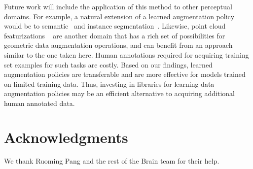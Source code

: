 \documentclass[10pt,twocolumn,letterpaper]{article}
\begin{document}
Future work will include the application of this method to other perceptual domains. For example, a natural extension of a learned augmentation policy would be to semantic~\cite{long2015fully} and instance segmentation~\cite{pinheiro2016learning,dai2016instance}. Likewise, point cloud featurizations ~\cite{qi2017pointnet,qi2017pointnet++} are another domain that has a rich set of possibilities for geometric data augmentation operations, and can benefit from an approach similar to the one taken here. Human annotations required for acquiring training set examples for such tasks are costly. Based on our findings, learned augmentation policies are transferable and are more effective for models trained on limited training data. Thus, investing in libraries for learning data augmentation policies may be an efficient alternative to acquiring additional human annotated data.  
\section*{Acknowledgments}
We thank Ruoming Pang and the rest of the Brain team for their help.
\end{document}
